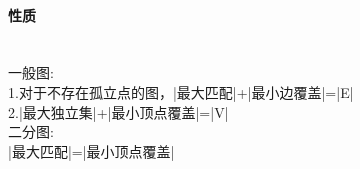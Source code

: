 \paragraph{性质}~{}
\\
一般图:\\
1.对于不存在孤立点的图，|最大匹配|+|最小边覆盖|=|E|\\
2.|最大独立集|+|最小顶点覆盖|=|V|\\
二分图:\\
|最大匹配|=|最小顶点覆盖|\\